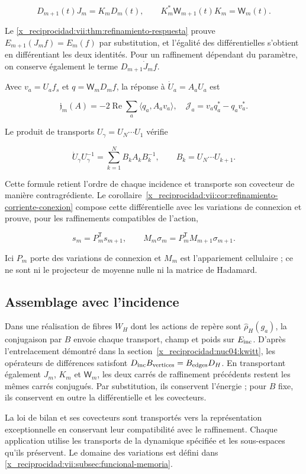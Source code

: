 \[
D_{m+1}(t)J_m=K_mD_m(t),\qquad
K_m^*\mathsf W_{m+1}(t)K_m=\mathsf W_m(t).
\]

Le \cref{x_reciprocidad:vii:thm:refinamiento-respuesta} prouve \(E_{m+1}(J_mf)=E_m(f)\) par substitution, et l’égalité des différentielles s’obtient en différentiant les deux identités. Pour un raffinement dépendant du paramètre, on conserve également le terme \(D_{m+1}\dot J_mf\).

Avec \(v_a=U_af_s\) et \(q=\mathsf W_mD_mf\), la réponse à \(\dot U_a=A_aU_a\) est

\[
\mathfrak j_m(A)=-2\operatorname{Re}\sum_a\langle q_a,A_av_a\rangle,
\quad \mathcal J_a=v_aq_a^*-q_av_a^*.
\]

Le produit de transports \(U_\gamma=U_N\cdots U_1\) vérifie

\[
\dot U_\gamma U_\gamma^{-1}
=\sum_{k=1}^N B_kA_kB_k^{-1},\qquad B_k=U_N\cdots U_{k+1}.
\]

Cette formule retient l’ordre de chaque incidence et transporte son covecteur de manière contragrédiente. Le corollaire~\ref{x_reciprocidad:vii:cor:refinamiento-corriente-conexion} compose cette différentielle avec les variations de connexion et prouve, pour les raffinements compatibles de l’action,

\[
s_m=P_m^{\mathsf T}s_{m+1},\qquad
M_m\sigma_m=P_m^{\mathsf T}M_{m+1}\sigma_{m+1}.
\]

Ici \(P_m\) porte des variations de connexion et \(M_m\) est l’appariement cellulaire ; ce ne sont ni le projecteur de moyenne nulle ni la matrice de Hadamard.

\subsection{Assemblage avec l’incidence}

Dans une réalisation de fibres \(W_H\) dont les actions de repère sont \(\widehat\rho_H(g_a)\), la conjugaison par \(B\) envoie chaque transport, champ et poids sur \(E_{\rm inc}\). D’après l’entrelacement démontré dans la section~\ref{x_reciprocidad:nuc04:kwitt}, les opérateurs de différences satisfont \(D_{\rm inc}B_{\rm vertices}=B_{\rm edges}D_H\). En transportant également \(J_m\), \(K_m\) et \(\mathsf W_m\), les deux carrés de raffinement précédents restent les mêmes carrés conjugués. Par substitution, ils conservent l’énergie ; pour \(B\) fixe, ils conservent en outre la différentielle et les covecteurs.

La loi de bilan et ses covecteurs sont transportés vers la représentation exceptionnelle en conservant leur compatibilité avec le raffinement. Chaque application utilise les transports de la dynamique spécifiée et les sous-espaces qu’ils préservent. Le domaine des variations est défini dans \cref{x_reciprocidad:vii:subsec:funcional-memoria}.
